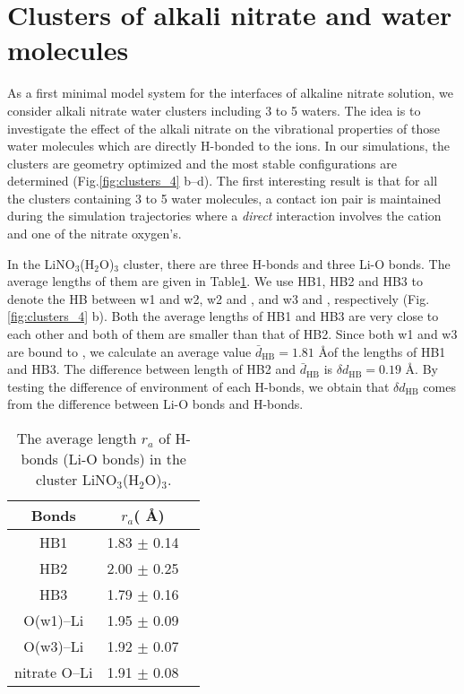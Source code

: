   \section{Clusters of alkali nitrate and water molecules}\label{paragraph_clusters_alkali_nitrate_and_water_molecules}
  As a first minimal model system for the interfaces of alkaline nitrate solution, we consider alkali nitrate water clusters including 3 to 5 waters. 
  The idea is to investigate the effect of the alkali nitrate on the vibrational properties of those water molecules which are directly 
  H-bonded to the ions.
  In our simulations, the clusters are geometry optimized and the most stable configurations are determined (Fig.\thinspace\ref{fig:clusters_4} b--d).
  The first interesting result is that for all the clusters containing 3 to 5 water molecules, a contact ion pair is maintained during the 
  simulation trajectories where a \emph{direct} interaction involves the cation and one of the nitrate oxygen's. 

In the LiNO$_3$(H$_2$O)$_3$ cluster, there are three H-bonds and three Li-O bonds. 
The average lengths of them are given in Table\thinspace\ref{tab:table_lino3}. 
We use HB1, HB2 and HB3 to denote the HB between w1 and w2, w2 and \nitrate, and w3 and \nitrate, 
respectively (Fig.\thinspace\ref{fig:clusters_4} b). Both the average lengths of HB1 and HB3 are very close 
to each other and both of them are smaller than that of HB2. 
Since both w1 and w3 are bound to \li, we calculate an average value $\bar{d}_{\text{HB}}=1.81$ \AA of the lengths of HB1 and HB3.
The difference between length of HB2 and $\bar{d}_{\text{HB}}$ is $\delta d_{\text{HB}}=0.19$ \AA.
By testing the difference of environment of each H-bonds,  we obtain that $\delta d_{\text{HB}}$ comes from the 
difference between Li-O bonds and H-bonds.
\begin{table}[htbp]
\centering
\caption{\label{tab:table_lino3}%
  The average length $r_a$ of H-bonds (Li-O bonds) in the cluster LiNO$_3$(H$_2$O)$_3$.}
\begin{tabular}{ccc}
Bonds& $r_a$( \AA) \\ 
\hline
HB1 &1.83 $\pm$ 0.14\\
HB2 &2.00 $\pm$ 0.25 \\
HB3 &1.79 $\pm$ 0.16 \\
O(w1)--Li &1.95 $\pm$ 0.09 \\
O(w3)--Li &1.92 $\pm$ 0.07 \\
nitrate O--Li &1.91 $\pm$ 0.08
\end{tabular}
\end{table}

